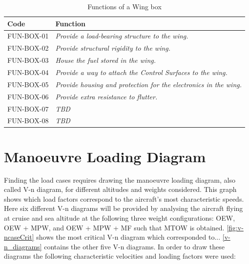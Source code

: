 \begin{table}[H]
    \centering
    \caption{Functions of a Wing box}
    \begin{tabularx}{\textwidth}{|p{} |p{}|}
        \hline
        \cellcolor{blue!15}\textbf{Code} & \cellcolor{blue!15}\textbf{Function} \\
        \hline

        \cellcolor{blue!15} FUN-BOX-01 & \textit{Provide a load-bearing structure to the wing.}\\
        \hline
        \cellcolor{blue!15} FUN-BOX-02 & \textit{Provide structural rigidity to the wing.}\\
        \hline
        \cellcolor{blue!15} FUN-BOX-03 & \textit{House the fuel stored in the wing.}\\
        \hline
        \cellcolor{blue!15} FUN-BOX-04 & \textit{Provide a way to attach the Control Surfaces to the wing.}\\
        \hline
        \cellcolor{blue!15} FUN-BOX-05 & \textit{Provide housing and protection for the electronics in the wing.}\\
        \hline
        \cellcolor{blue!15} FUN-BOX-06 & \textit{Provide extra resistance to flutter.}\\
        \hline
        \cellcolor{blue!15} FUN-BOX-07 & \textit{TBD}\\
        \hline
        \cellcolor{blue!15} FUN-BOX-08 & \textit{TBD}\\
        \hline
        
        
    \end{tabularx}
      
        \label{tab:Wingbox_functions}
\end{table}

\section{Manoeuvre Loading Diagram}
\label{sec:Loading_Diagrams}

\noindent Finding the load cases requires drawing the manoeuvre loading diagram, also called V-n diagram, for different altitudes and weights considered. This graph shows which load factors correspond to the aircraft's most characteristic speeds. Here six different V-n diagrams will be provided by analysing the aircraft flying at cruise and sea altitude at the following three weight configurations: OEW, OEW + MPW, and OEW + MPW + MF such that MTOW is obtained. \autoref{fig:v-ncaseCrit} shows the most critical V-n diagram which corresponded to... \autoref{v-n_diagrams} contains the other five V-n diagrams. In order to draw these diagrams the following characteristic velocities and loading factors were used:

